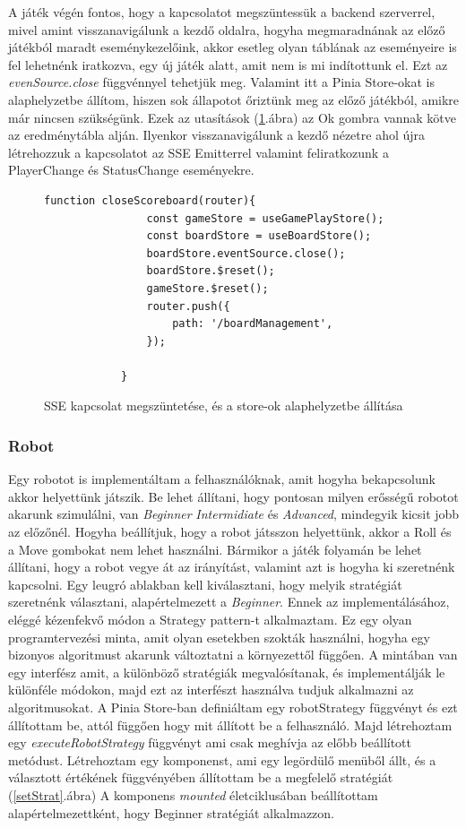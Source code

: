\documentclass[a4paper,twoside]{article}
\begin{document}
A játék végén fontos, hogy a kapcsolatot megszüntessük a backend szerverrel, mivel amint visszanavigálunk a kezdő oldalra, hogyha megmaradnának az előző játékból maradt eseménykezelőink, akkor esetleg olyan táblának az eseményeire is fel lehetnénk iratkozva, egy új játék alatt, amit nem is mi indítottunk el. Ezt az \textit{evenSource.close} függvénnyel tehetjük meg. Valamint itt a Pinia Store-okat is alaphelyzetbe állítom, hiszen sok állapotot őriztünk meg az előző játékból, amikre már nincsen szükségünk. Ezek az utasítások (\ref{reset}.ábra) az Ok gombra vannak kötve az eredménytábla alján. Ilyenkor visszanavigálunk a kezdő nézetre ahol újra létrehozzuk a kapcsolatot az SSE Emitterrel valamint feliratkozunk a PlayerChange és StatusChange eseményekre.  
\begin{figure}
	\caption{SSE kapcsolat megszüntetése, és a store-ok alaphelyzetbe állítása}
	\begin{minipage}{\textwidth}
		\begin{lstlisting}[style=javascriptStyle]
			function closeScoreboard(router){
				const gameStore = useGamePlayStore();
				const boardStore = useBoardStore();
				boardStore.eventSource.close();
				boardStore.$reset();
				gameStore.$reset();
				router.push({
					path: '/boardManagement',
				});
				
			}
		\end{lstlisting}
	\end{minipage}
	
	\label{reset}
\end{figure}
\FloatBarrier
\subsubsection{Robot}
Egy robotot is implementáltam a felhasználóknak, amit hogyha bekapcsolunk akkor helyettünk játszik. Be lehet állítani, hogy pontosan milyen erősségű robotot akarunk szimulálni, van \textit{Beginner} \textit{Intermidiate} és \textit{Advanced}, mindegyik kicsit jobb az előzőnél. Hogyha beállítjuk, hogy a robot játsszon helyettünk, akkor a Roll és a Move gombokat nem lehet használni. Bármikor a játék folyamán be lehet állítani, hogy a robot vegye át az irányítást, valamint azt is hogyha ki szeretnénk kapcsolni. Egy leugró ablakban kell kiválasztani, hogy melyik stratégiát szeretnénk választani, alapértelmezett a \textit{Beginner}. Ennek az implementálásához, eléggé kézenfekvő módon a Strategy pattern-t alkalmaztam. Ez egy olyan programtervezési minta, amit olyan esetekben szokták használni, hogyha egy bizonyos algoritmust akarunk változtatni a környezettől függően. A mintában van egy interfész amit, a különböző stratégiák megvalósítanak, és implementálják le különféle módokon, majd ezt az interfészt használva tudjuk alkalmazni az algoritmusokat. A Pinia Store-ban definiáltam egy robotStrategy függvényt és ezt állítottam be, attól függően hogy mit állított be a felhasználó. Majd létrehoztam egy \textit{executeRobotStrategy} függvényt ami csak meghívja az előbb beállított metódust. Létrehoztam egy komponenst, ami egy legördülő menüből állt, és a választott értékének függvényében állítottam be a megfelelő stratégiát (\ref{setStrat}.ábra) A komponens \textit{mounted} életciklusában beállítottam alapértelmezettként, hogy Beginner stratégiát alkalmazzon.
\end{document}
